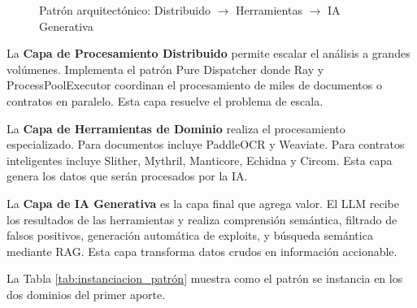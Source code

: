 \documentclass[12pt,a4paper,twoside]{book}
\begin{document}
\begin{figure}[h]
\centering
{}
\caption{Patrón arquitectónico: Distribuido $\rightarrow$ Herramientas $\rightarrow$ IA Generativa}
\label{fig:patrón_arquitectónico}
\end{figure}

La \textbf{Capa de Procesamiento Distribuido} permite escalar el análisis a grandes volúmenes. Implementa el patrón Pure Dispatcher donde Ray y ProcessPoolExecutor coordinan el procesamiento de miles de documentos o contratos en paralelo. Esta capa resuelve el problema de escala.

La \textbf{Capa de Herramientas de Dominio} realiza el procesamiento especializado. Para documentos incluye PaddleOCR y Weaviate. Para contratos inteligentes incluye Slither, Mythril, Manticore, Echidna y Circom. Esta capa genera los datos que serán procesados por la IA.

La \textbf{Capa de IA Generativa} es la capa final que agrega valor. El LLM recibe los resultados de las herramientas y realiza comprensión semántica, filtrado de falsos positivos, generación automática de exploits, y búsqueda semántica mediante RAG. Esta capa transforma datos crudos en información accionable.

La Tabla \ref{tab:instanciacion_patrón} muestra como el patrón se instancia en los dos dominios del primer aporte.
\end{document}
